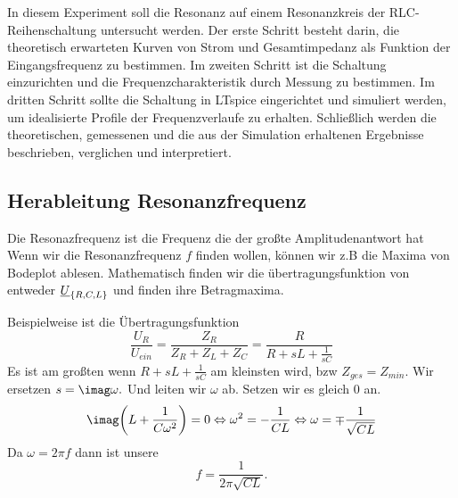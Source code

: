 %
%
%
%
%
In diesem Experiment soll die Resonanz auf einem Resonanzkreis der RLC-Reihenschaltung untersucht werden. Der erste Schritt besteht darin, die theoretisch erwarteten Kurven von Strom und Gesamtimpedanz als Funktion der Eingangsfrequenz zu bestimmen. Im zweiten Schritt ist die Schaltung einzurichten und die Frequenzcharakteristik durch Messung zu bestimmen. Im dritten Schritt sollte die Schaltung in LTspice eingerichtet und simuliert werden, um idealisierte Profile der Frequenzverlaufe zu erhalten. Schließlich werden die theoretischen, gemessenen und die aus der Simulation erhaltenen Ergebnisse beschrieben, verglichen und interpretiert.
\begin{flushright}
  \textit{\autorA}
\end{flushright}
%
%
%
\subsection{Herableitung Resonanzfrequenz}
Die Resonazfrequenz ist die Frequenz die der großte Amplitudenantwort hat
Wenn wir die Resonanzfrequenz $f$ finden wollen, können wir z.B die Maxima von Bodeplot ablesen. Mathematisch finden wir die übertragungsfunktion von entweder $\underline{U}_\qty{R,C,L}$ und finden ihre Betragmaxima.

Beispielweise ist die Übertragungsfunktion \[\frac{U_R}{U_{ein}}=\frac{Z_R}{Z_R+Z_L+Z_C}=\frac{R}{R+sL+\frac{1}{sC}}\]
Es ist am großten wenn $R+sL+\frac{1}{sC}$ am kleinsten wird, bzw $Z_{ges}=Z_{min}.$
Wir ersetzen $s=\imag \omega.$
Und leiten wir $\omega$ ab. Setzen wir es gleich 0 an.
\[\imag\qty(L+\frac{1}{C \omega^2})=0\>\omega^2=-\frac{1}{C L}\>\omega=\mp \frac{1}{\sqrt{CL}}\]
Da $\omega = 2 \pi f$ dann ist unsere \[f=\frac{1}{2 \pi \sqrt{C L}}.\]




%
%
%
%
%
%
%
%
%
%
%
%
%
%
%
%

